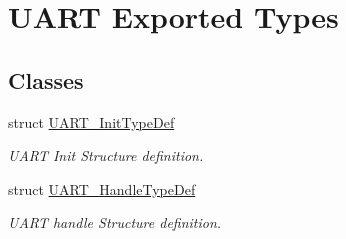 \hypertarget{group___u_a_r_t___exported___types}{}\section{U\+A\+RT Exported Types}
\label{group___u_a_r_t___exported___types}
\subsection*{Classes}
\begin{DoxyCompactItemize}
\item 
struct \hyperlink{struct_u_a_r_t___init_type_def}{U\+A\+R\+T\+\_\+\+Init\+Type\+Def}
\begin{DoxyCompactList}\small\item\em U\+A\+RT Init Structure definition. \end{DoxyCompactList}\item 
struct \hyperlink{struct_u_a_r_t___handle_type_def}{U\+A\+R\+T\+\_\+\+Handle\+Type\+Def}
\begin{DoxyCompactList}\small\item\em U\+A\+RT handle Structure definition. \end{DoxyCompactList}\end{DoxyCompactItemize}

